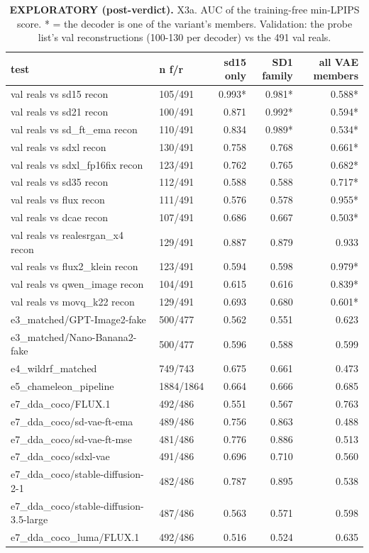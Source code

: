 \begin{table}[htbp]
\centering
\scriptsize
\caption{\textbf{EXPLORATORY (post-verdict).} X3a. AUC of the training-free min-LPIPS score. * = the decoder is one of the variant's members. Validation: the probe list's val reconstructions (100-130 per decoder) vs the 491 val reals.}
\label{tab:x3a-auc}
\begin{tabular}{llrrr}
\toprule
test & n f/r & sd15 only & SD1 family & all VAE members \\
\midrule
val reals vs sd15 recon & 105/491 & 0.993* & 0.981* & 0.588* \\
val reals vs sd21 recon & 100/491 & 0.871 & 0.992* & 0.594* \\
val reals vs sd\_ft\_ema recon & 110/491 & 0.834 & 0.989* & 0.534* \\
val reals vs sdxl recon & 130/491 & 0.758 & 0.768 & 0.661* \\
val reals vs sdxl\_fp16fix recon & 123/491 & 0.762 & 0.765 & 0.682* \\
val reals vs sd35 recon & 112/491 & 0.588 & 0.588 & 0.717* \\
val reals vs flux recon & 111/491 & 0.576 & 0.578 & 0.955* \\
val reals vs dcae recon & 107/491 & 0.686 & 0.667 & 0.503* \\
val reals vs realesrgan\_x4 recon & 129/491 & 0.887 & 0.879 & 0.933 \\
val reals vs flux2\_klein recon & 123/491 & 0.594 & 0.598 & 0.979* \\
val reals vs qwen\_image recon & 104/491 & 0.615 & 0.616 & 0.839* \\
val reals vs movq\_k22 recon & 129/491 & 0.693 & 0.680 & 0.601* \\
e3\_matched/GPT-Image2-fake & 500/477 & 0.562 & 0.551 & 0.623 \\
e3\_matched/Nano-Banana2-fake & 500/477 & 0.596 & 0.588 & 0.599 \\
e4\_wildrf\_matched & 749/743 & 0.675 & 0.661 & 0.473 \\
e5\_chameleon\_pipeline & 1884/1864 & 0.664 & 0.666 & 0.685 \\
e7\_dda\_coco/FLUX.1 & 492/486 & 0.551 & 0.567 & 0.763 \\
e7\_dda\_coco/sd-vae-ft-ema & 489/486 & 0.756 & 0.863 & 0.488 \\
e7\_dda\_coco/sd-vae-ft-mse & 481/486 & 0.776 & 0.886 & 0.513 \\
e7\_dda\_coco/sdxl-vae & 491/486 & 0.696 & 0.710 & 0.560 \\
e7\_dda\_coco/stable-diffusion-2-1 & 482/486 & 0.787 & 0.895 & 0.538 \\
e7\_dda\_coco/stable-diffusion-3.5-large & 487/486 & 0.563 & 0.571 & 0.598 \\
e7\_dda\_coco\_luma/FLUX.1 & 492/486 & 0.516 & 0.524 & 0.635 \\
\bottomrule
\end{tabular}
\end{table}
